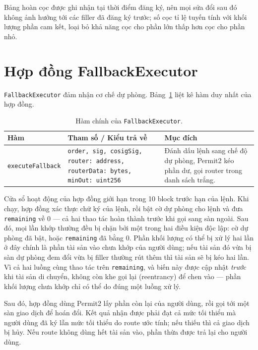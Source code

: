 \documentclass[../DoAn.tex]{subfiles}
\begin{document}
Bảng hoàn cọc được ghi nhận tại thời điểm đăng ký, nên mọi sửa đổi sau đó không ảnh hưởng tới các filler đã đăng ký trước; số cọc tỉ lệ tuyến tính với khối lượng phần cam kết, loại bỏ khả năng cọc cho phần lớn thấp hơn cọc cho phần nhỏ.

\section{Hợp đồng FallbackExecutor}
\label{subsec:fallback}

\texttt{FallbackExecutor} đảm nhận cơ chế dự phòng. Bảng~\ref{table:fe_methods} liệt kê hàm duy nhất của hợp đồng.

\begin{table}[H]
    \centering
    \caption{Hàm chính của \texttt{FallbackExecutor}.}
    \label{table:fe_methods}
    \begin{tabular}{|p{4cm}|p{4.5cm}|p{5.5cm}|}
        \hline
        \textbf{Hàm} & \textbf{Tham số / Kiểu trả về} & \textbf{Mục đích} \\
        \hline
        \texttt{executeFallback} &
            \texttt{order, sig, cosigSig,} \newline \texttt{router: address,} \newline \texttt{routerData: bytes,} \newline \texttt{minOut: uint256} &
            Đánh dấu lệnh sang chế độ dự phòng, Permit2 kéo phần dư, gọi router trong danh sách trắng. \\
        \hline
    \end{tabular}
\end{table}

Cửa sổ hoạt động của hợp đồng giới hạn trong 10 block trước hạn của lệnh. Khi chạy, hợp đồng xác thực chữ ký của lệnh, rồi bật cờ dự phòng cho lệnh và đưa \texttt{remaining} về 0 --- cả hai thao tác hoàn thành trước khi gọi sang sàn ngoài. Sau đó, mọi lần khớp thường đều bị chặn bởi một trong hai điều kiện độc lập: cờ dự phòng đã bật, hoặc \texttt{remaining} đã bằng 0. Phần khối lượng có thể bị xử lý hai lần ở đây chính là phần tài sản vào chưa khớp của người dùng; nếu tài sản đó vừa bị sàn dự phòng đem đổi vừa bị filler thường rút thêm thì tài sản sẽ bị kéo hai lần. Vì cả hai luồng cùng thao tác trên \texttt{remaining}, và biến này được cập nhật \emph{trước} khi tài sản di chuyển, không còn khe gọi lại (reentrancy) để chen vào --- phần khối lượng chưa khớp chỉ có thể do đúng một luồng xử lý.

Sau đó, hợp đồng dùng Permit2 lấy phần còn lại của người dùng, rồi gọi tới một sàn giao dịch để hoán đổi. Kết quả nhận được phải đạt cả mức tối thiểu mà người dùng đã ký lẫn mức tối thiểu do route ước tính; nếu thiếu thì cả giao dịch bị hủy. Nếu route không dùng hết tài sản vào, phần thừa được trả lại cho người dùng.
\end{document}
